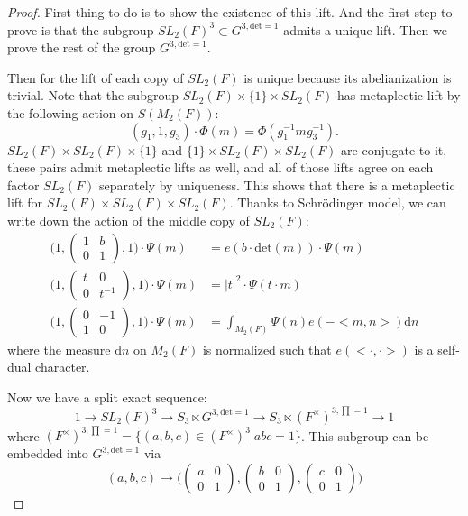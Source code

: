 \documentclass[12pt,a4paper,english]{article}
\theoremstyle{plain}
\theoremstyle{definition}
\begin{document}
\begin{proof}
First thing to do is to show the existence of this lift. And the first step to prove is that the subgroup $SL_{2}(F)^{3}\subset G^{3,\text{det}=1}$ admits a unique lift. Then we prove the rest of the group $G^{3,\text{det}=1}$. 

Then for the lift of each copy of $SL_{2}(F)$ is unique because its abelianization is trivial. Note that the subgroup $SL_{2}(F)\times\{1\}\times SL_{2}(F)$ has metaplectic lift by the following action on $S(M_{2}(F))$:
\begin{equation*}
    (g_{1},1,g_{3})\cdot \Phi(m)=\Phi(g_{1}^{-1}mg^{-1}_{3}).
\end{equation*}
$SL_{2}(F)\times SL_{2}(F)\times\{1\}$ and $\{1\}\times SL_{2}(F)\times SL_{2}(F)$ are conjugate to it, these pairs admit metaplectic lifts as well, and all of those lifts agree on each factor $SL_{2}(F)$ separately by uniqueness. This shows that there is a metaplectic lift for $SL_{2}(F)\times SL_{2}(F)\times SL_{2}(F)$. Thanks to Schrödinger model, we can write down the action of the middle copy of $SL_{2}(F)$:
\begin{align*}
    \big(1,\begin{pmatrix}
    1&b\\
    0&1
    \end{pmatrix},1\big)\cdot \Psi(m)&=e(b\cdot \text{det}(m))\cdot \Psi(m)\\
    \big(1, \begin{pmatrix}
    t &0\\
    0& t^{-1}
    \end{pmatrix},1\big)\cdot \Psi(m)&=|t|^{2}\cdot \Psi(t\cdot m)\\
    \big(1, \begin{pmatrix}
    0&-1\\
    1 & 0
    \end{pmatrix},1\big)\cdot \Psi(m)&=\int_{M_{2}(F)}\Psi(n)e(-<m,n>)\text{d}n
\end{align*}
where the measure $\text{d}n$ on $M_{2}(F)$ is normalized such that $e(<\cdot, \cdot>)$ is a self-dual character. 

Now we have a split exact sequence:
\begin{equation*}
    1\rightarrow SL_{2}(F)^{3}\rightarrow S_{3}\ltimes G^{3,\text{det}=1}\rightarrow S_{3}\ltimes (F^{\times})^{3,\prod=1}\rightarrow 1
\end{equation*}
where $(F^{\times})^{3,\prod=1}=\{(a,b,c)\in (F^{\times})^{3}|abc=1\}$. This subgroup can be embedded into $G^{3,\text{det}=1}$ via
\begin{equation*}
    (a,b,c)\rightarrow \bigg(\begin{pmatrix}
    a&0\\
    0&1
    \end{pmatrix},\begin{pmatrix}
    b&0\\
    0&1
    \end{pmatrix},
    \begin{pmatrix}
    c&0\\
    0&1
    \end{pmatrix}\bigg)
\end{equation*}


\end{proof}
\end{document}
